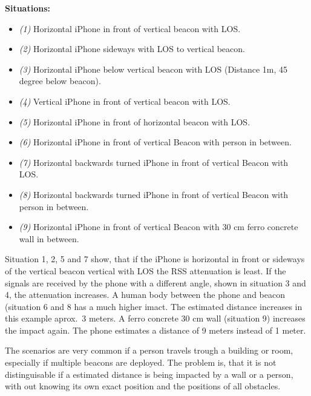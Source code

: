 \textbf{Situations:}
\begin{itemize}
  \item \emph{(1)} Horizontal iPhone in front of vertical beacon with \acs{LOS}.
  \item \emph{(2)} Horizontal iPhone sideways with \acs{LOS} to vertical beacon.
  \item \emph{(3)} Horizontal iPhone below vertical beacon with \acs{LOS} (Distance 1m, 45 degree below beacon).
  \item \emph{(4)} Vertical iPhone in front of vertical beacon with \acs{LOS}.
  \item \emph{(5)} Horizontal iPhone in front of horizontal beacon with \acs{LOS}.
  \item \emph{(6)} Horizontal iPhone in front of vertical Beacon with person in between.
  \item \emph{(7)} Horizontal backwards turned iPhone in front of vertical Beacon with \acs{LOS}.
  \item \emph{(8)} Horizontal backwards turned iPhone in front of vertical Beacon with person in between.
  \item \emph{(9)} Horizontal iPhone in front of vertical Beacon with 30 cm ferro concrete wall in between.
\end{itemize}

Situation 1, 2, 5 and 7 show, that if the iPhone is horizontal in front or sideways of the vertical beacon vertical with \acs{LOS} the \acs{RSS} attenuation is least.
If the signals are received by the phone with a different angle, shown in situation 3 and 4, the attenuation increases.
A human body between the phone and beacon (situation 6 and 8 has a much higher imact. The estimated distance increases in this example aprox.\ 3 meters.
A ferro concrete 30 cm wall (situation 9) increases the impact again. The phone estimates a distance of 9 meters instead of 1 meter.

The scenarios are very common if a person travels trough a building or room, especially if multiple beacons are deployed.
The problem is, that it is not distinguisable if a estimated distance is being impacted by a wall or a person, with out knowing its own exact position and the positions of all obstacles.\newline

